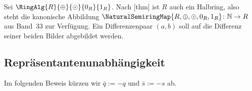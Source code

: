 \documentclass[main.tex]{subfiles}
\begin{document}
Sei \(\RingAlg{R}{\oplus}{\odot}{0_R}{1_R}\). Nach
[thm] ist \(R\) auch ein Halbring,
also steht die kanonische Abbildung
\(\NaturalSemiringMap{R,\oplus,\odot,0_R,1_R}\colon\mathbb N\to R\)
aus Band~33 zur Verfügung. Ein Differenzenpaar \((a,b)\) soll auf die
Differenz seiner beiden Bilder abgebildet werden.

\subsection{Repräsentantenunabhängigkeit}

Im folgenden Beweis kürzen wir
\(\bar q:=-q\) und \(\bar s:=-s\) ab.
\end{document}
